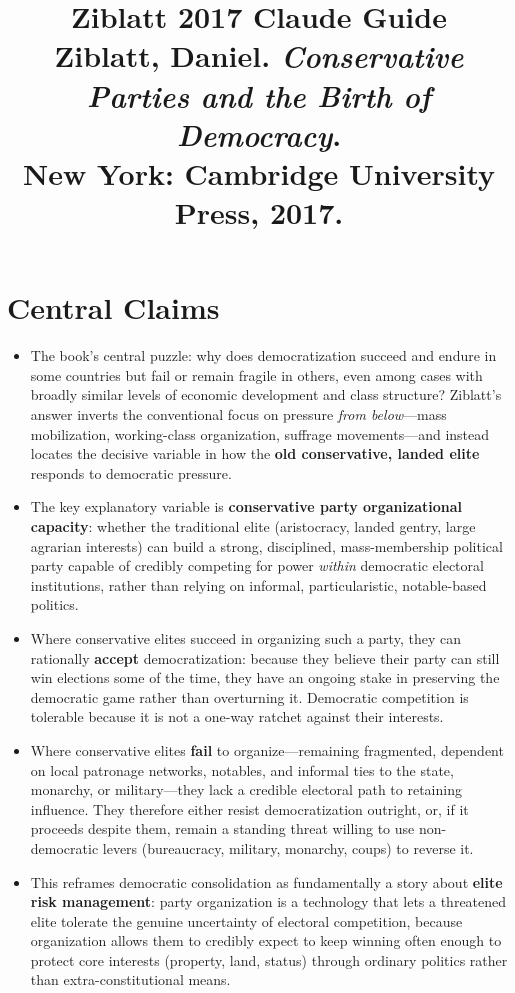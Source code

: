 \documentclass[12pt]{article}
\title{\textbf{Ziblatt 2017 Claude Guide}\\
\large Ziblatt, Daniel. \textit{Conservative Parties and the Birth of Democracy}.\\
New York: Cambridge University Press, 2017.}
\author{}
\date{}
\begin{document}
\maketitle
\tableofcontents
\newpage

\section{Central Claims}

\begin{itemize}[leftmargin=*, itemsep=4pt]
    \item The book's central puzzle: why does democratization succeed and endure in some countries but fail or remain fragile in others, even among cases with broadly similar levels of economic development and class structure? Ziblatt's answer inverts the conventional focus on pressure \emph{from below}---mass mobilization, working-class organization, suffrage movements---and instead locates the decisive variable in how the \textbf{old conservative, landed elite} responds to democratic pressure.
    \item The key explanatory variable is \textbf{conservative party organizational capacity}: whether the traditional elite (aristocracy, landed gentry, large agrarian interests) can build a strong, disciplined, mass-membership political party capable of credibly competing for power \emph{within} democratic electoral institutions, rather than relying on informal, particularistic, notable-based politics.
    \item Where conservative elites succeed in organizing such a party, they can rationally \textbf{accept} democratization: because they believe their party can still win elections some of the time, they have an ongoing stake in preserving the democratic game rather than overturning it. Democratic competition is tolerable because it is not a one-way ratchet against their interests.
    \item Where conservative elites \textbf{fail} to organize---remaining fragmented, dependent on local patronage networks, notables, and informal ties to the state, monarchy, or military---they lack a credible electoral path to retaining influence. They therefore either resist democratization outright, or, if it proceeds despite them, remain a standing threat willing to use non-democratic levers (bureaucracy, military, monarchy, coups) to reverse it.
    \item This reframes democratic consolidation as fundamentally a story about \textbf{elite risk management}: party organization is a technology that lets a threatened elite tolerate the genuine uncertainty of electoral competition, because organization allows them to credibly expect to keep winning often enough to protect core interests (property, land, status) through ordinary politics rather than extra-constitutional means.

\end{itemize}
\end{document}
